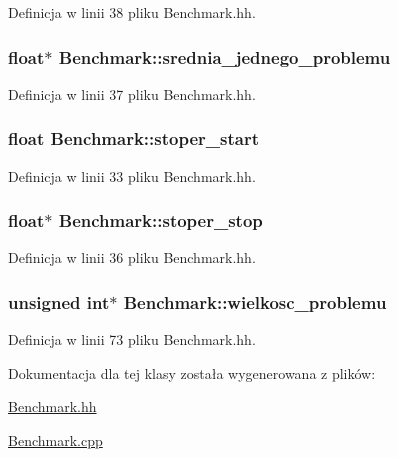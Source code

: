 Definicja w linii 38 pliku Benchmark.hh.

\hypertarget{class_benchmark_a1eea18c08dc325a4723ef0b2084938d6}{
\subsubsection[{srednia\_\-jednego\_\-problemu}]{\setlength{\rightskip}{0pt plus 5cm}float$\ast$ {\bf Benchmark::srednia\_\-jednego\_\-problemu}}}
\label{class_benchmark_a1eea18c08dc325a4723ef0b2084938d6}


Definicja w linii 37 pliku Benchmark.hh.

\hypertarget{class_benchmark_a9809e00b248161927de3cbd71fd8d424}{
\subsubsection[{stoper\_\-start}]{\setlength{\rightskip}{0pt plus 5cm}float {\bf Benchmark::stoper\_\-start}}}
\label{class_benchmark_a9809e00b248161927de3cbd71fd8d424}


Definicja w linii 33 pliku Benchmark.hh.

\hypertarget{class_benchmark_aa33949783712cd5f501a32b4f497f8e9}{
\subsubsection[{stoper\_\-stop}]{\setlength{\rightskip}{0pt plus 5cm}float$\ast$ {\bf Benchmark::stoper\_\-stop}}}
\label{class_benchmark_aa33949783712cd5f501a32b4f497f8e9}


Definicja w linii 36 pliku Benchmark.hh.

\hypertarget{class_benchmark_aef4c89962e86bfe41f406c620e4b6ec6}{
\subsubsection[{wielkosc\_\-problemu}]{\setlength{\rightskip}{0pt plus 5cm}unsigned int$\ast$ {\bf Benchmark::wielkosc\_\-problemu}}}
\label{class_benchmark_aef4c89962e86bfe41f406c620e4b6ec6}


Definicja w linii 73 pliku Benchmark.hh.



Dokumentacja dla tej klasy została wygenerowana z plików:\begin{DoxyCompactItemize}
\item 
\hyperlink{_benchmark_8hh}{Benchmark.hh}\item 
\hyperlink{_benchmark_8cpp}{Benchmark.cpp}\end{DoxyCompactItemize}
